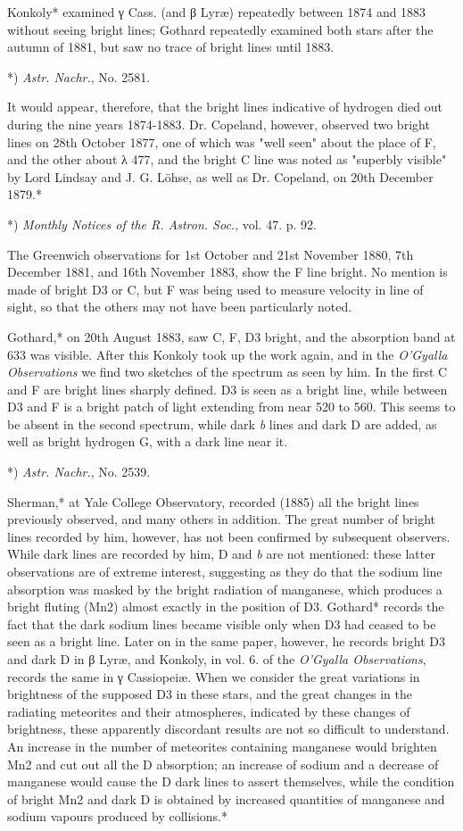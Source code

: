 \documentclass[a4paper, 12pt, oneside, polutonikogreek, english]{article}
\begin{document}
Konkoly* examined γ Cass. (and β Lyræ) repeatedly between 1874 and 1883 without seeing bright lines; Gothard repeatedly examined both stars after the autumn of 1881, but saw no trace of bright lines until 1883.

*) \emph{Astr. Nachr.}, No. 2581.

It would appear, therefore, that the bright lines indicative of hydrogen died out during the nine years 1874-1883. Dr. Copeland, however, observed two bright lines on 28th October 1877, one of which was "well seen" about the place of F, and the other about λ 477, and the bright C line was noted as "superbly visible" by Lord Lindsay and J. G. Löhse, as well as Dr. Copeland, on 20th December 1879.*

*) \emph{Monthly Notices of the R. Astron. Soc.}, vol. 47. p. 92.

The Greenwich observations for 1st October and 21st November 1880, 7th December 1881, and 16th November 1883, show the F line bright. No mention is made of bright D3 or C, but F was being used to measure velocity in line of sight, so that the others may not have been particularly noted.

Gothard,* on 20th August 1883, saw C, F, D3 bright, and the absorption band at 633 was visible. After this Konkoly took up the work again, and in the \emph{O'Gyalla Observations} we find two sketches of the spectrum as seen by him. In the first C and F are bright lines sharply defined. D3 is seen as a bright line, while between D3 and F is a bright patch of light extending from near 520 to 560. This seems to be absent in the second spectrum, while dark \emph{b} lines and dark D are added, as well as bright hydrogen G, with a dark line near it.

*) \emph{Astr. Nachr.}, No. 2539.

Sherman,* at Yale College Observatory, recorded (1885) all the bright lines previously observed, and many others in addition. The great number of bright lines recorded by him, however, has not been confirmed by subsequent observers. While dark lines are recorded by him, D and \emph{b} are not mentioned: these latter observations are of extreme interest, suggesting as they do that the sodium line absorption was masked by the bright radiation of manganese, which produces a bright fluting (Mn2) almost exactly in the position of D3. Gothard* records the fact that the dark sodium lines became visible only when D3 had ceased to be seen as a bright line. Later on in the same paper, however, he records bright D3 and dark D in β Lyræ, and Konkoly, in vol. 6. of the \emph{O'Gyalla Observations}, records the same in γ Cassiopeiæ. When we consider the great variations in brightness of the supposed D3 in these stars, and the great changes in the radiating meteorites and their atmospheres, indicated by these changes of brightness, these apparently discordant results are not so difficult to understand. An increase in the number of meteorites containing manganese would brighten Mn2 and cut out all the D absorption; an increase of sodium and a decrease of manganese would cause the D dark lines to assert themselves, while the condition of bright Mn2 and dark D is obtained by increased quantities of manganese and sodium vapours produced by collisions.*
\end{document}

